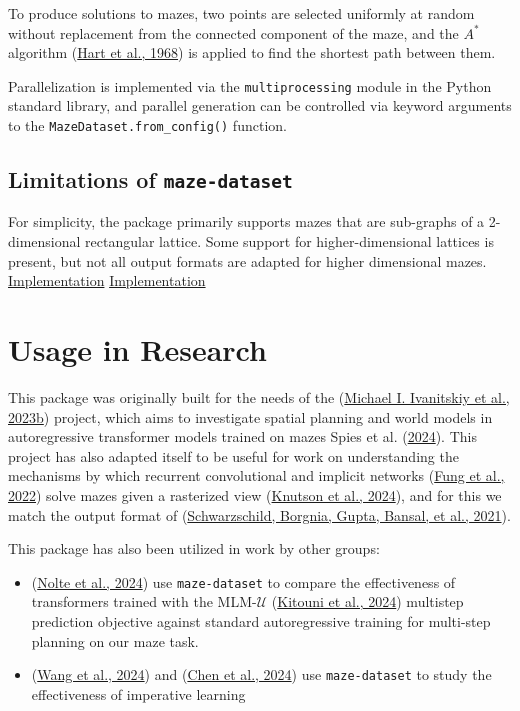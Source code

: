 \documentclass[10pt,a4paper,onecolumn]{article}
\begin{document}
To produce solutions to mazes, two points are selected uniformly at
random without replacement from the connected component of the maze, and
the \(A^*\) algorithm (\protect\hyperlink{ref-A_star}{Hart et al.,
1968}) is applied to find the shortest path between them.

Parallelization is implemented via the \texttt{multiprocessing} module
in the Python standard library, and parallel generation can be
controlled via keyword arguments to the
\texttt{MazeDataset.from\_config()} function.

\hypertarget{limitations}{%
\subsection{\texorpdfstring{Limitations of
\texttt{maze-dataset}}{Limitations of maze-dataset}}\label{limitations}}

For simplicity, the package primarily supports mazes that are sub-graphs
of a 2-dimensional rectangular lattice. Some support for
higher-dimensional lattices is present, but not all output formats are
adapted for higher dimensional mazes.
\protect\hyperlink{implementation-implementation}{Implementation}
\protect\hyperlink{implementation-implementation}{Implementation}

\hypertarget{usage-in-research}{%
\section{Usage in Research}\label{usage-in-research}}

This package was originally built for the needs of the
(\protect\hyperlink{ref-maze-transformer-github}{Michael I. Ivanitskiy
et al., 2023b}) project, which aims to investigate spatial planning and
world models in autoregressive transformer models trained on mazes Spies
et al. (\protect\hyperlink{ref-spies2024causalworldmodels}{2024}). This
project has also adapted itself to be useful for work on understanding
the mechanisms by which recurrent convolutional and implicit networks
(\protect\hyperlink{ref-fung2022jfb}{Fung et al., 2022}) solve mazes
given a rasterized view
(\protect\hyperlink{ref-knutson2024logicalextrapolation}{Knutson et al.,
2024}), and for this we match the output format of
(\protect\hyperlink{ref-easy_to_hard}{Schwarzschild, Borgnia, Gupta,
Bansal, et al., 2021}).

This package has also been utilized in work by other groups:

\begin{itemize}
\item
  (\protect\hyperlink{ref-nolte2024multistep}{Nolte et al., 2024}) use
  \texttt{maze-dataset} to compare the effectiveness of transformers
  trained with the MLM-\(\mathcal{U}\)
  (\protect\hyperlink{ref-MLMU-kitouni2024factorization}{Kitouni et al.,
  2024}) multistep prediction objective against standard autoregressive
  training for multi-step planning on our maze task.
\item
  (\protect\hyperlink{ref-wang2024imperative}{Wang et al., 2024}) and
  (\protect\hyperlink{ref-chen2024iaimperative}{Chen et al., 2024}) use
  \texttt{maze-dataset} to study the effectiveness of imperative
  learning
\end{itemize}
\end{document}
